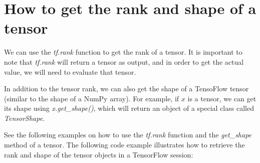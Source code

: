 \documentclass[11pt]{article}
\begin{document}
    \section{How to get the rank and shape of a
tensor}\label{how-to-get-the-rank-and-shape-of-a-tensor}

    We can use the \emph{tf.rank} function to get the rank of a tensor. It
is important to note that \emph{tf.rank} will return a tensor as output,
and in order to get the actual value, we will need to evaluate that
tensor.

In addition to the tensor rank, we can also get the shape of a TensoFlow
tensor (similar to the shape of a NumPy array). For example, if \(x\) is
a tensor, we can get its shape using \emph{x.get\_shape()}, which will
return an object of a special class called \emph{TensorShape}.

See the following examples on how to use the \emph{tf.rank} function and
the \emph{get\_shape} method of a tensor. The following code example
illustrates how to retrieve the rank and shape of the tensor objects in
a TensorFlow session:
\end{document}
